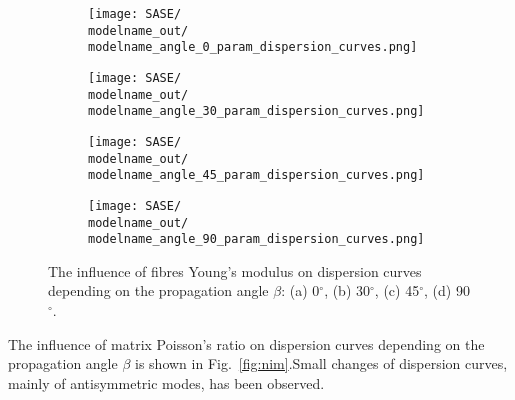 \documentclass[preprint,12pt]{elsarticle}
\begin{document}
\begin{figure} [h!]
	\centering
	\newcommand{\modelname}{SASE5}
	\begin{subfigure}[b]{0.49\textwidth}
		\centering
		\texttt{[image: SASE/\\modelname\_out/\\modelname\_angle\_0\_param\_dispersion\_curves.png]}
		\caption{}
		\label{fig:ef0}
	\end{subfigure}
	\hfill
	\begin{subfigure}[b]{0.49\textwidth}
		\centering
		\texttt{[image: SASE/\\modelname\_out/\\modelname\_angle\_30\_param\_dispersion\_curves.png]}
		\caption{}
		\label{fig:ef30}
	\end{subfigure}
	\begin{subfigure}[b]{0.49\textwidth}
		\centering
		\texttt{[image: SASE/\\modelname\_out/\\modelname\_angle\_45\_param\_dispersion\_curves.png]}
		\caption{}
		\label{fig:ef45}
	\end{subfigure}
	\hfill
	\begin{subfigure}[b]{0.49\textwidth}
		\centering
		\texttt{[image: SASE/\\modelname\_out/\\modelname\_angle\_90\_param\_dispersion\_curves.png]}
		\caption{}
		\label{fig:ef90}
	\end{subfigure}
	\caption{The influence of fibres Young's modulus on dispersion curves depending on the propagation angle $\beta$: (a) 0$^{\circ}$, (b) 30$^{\circ}$, (c) 45$^{\circ}$, (d) 90$^{\circ}$.} 
	\label{fig:ef}
\end{figure}
\clearpage

The influence of matrix Poisson's ratio on dispersion curves depending on the propagation angle $\beta$ is shown in Fig.~\ref{fig:nim}.Small changes of dispersion curves, mainly of antisymmetric modes, has been observed.
\end{document}
